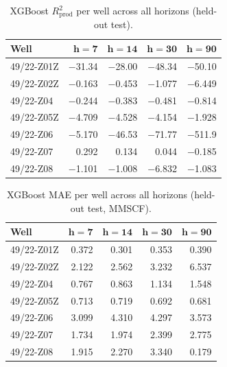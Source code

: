 \documentclass[10pt]{article}
\begin{document}
\begin{table}[ht]
\centering
\caption{XGBoost $R^2_\text{prod}$ per well across all horizons (held-out test).}
\label{tab:xgboost_r2prod_perwell}
\small
\begin{tabular}{@{}l rrrr @{}}
\toprule
\textbf{Well} & $\boldsymbol{h{=}7}$ & $\boldsymbol{h{=}14}$ & $\boldsymbol{h{=}30}$ & $\boldsymbol{h{=}90}$ \\
\midrule
49/22-Z01Z & $-$31.34  & $-$28.00  & $-$48.34  & $-$50.10  \\
49/22-Z02Z &   $-$0.163 &   $-$0.453 &   $-$1.077 &   $-$6.449 \\
49/22-Z04  &   $-$0.244 &   $-$0.383 &   $-$0.481 &   $-$0.814 \\
49/22-Z05Z &   $-$4.709 &   $-$4.528 &   $-$4.154 &   $-$1.928 \\
49/22-Z06  &   $-$5.170 &  $-$46.53  &  $-$71.77  & $-$511.9   \\
49/22-Z07  &    0.292 &    0.134 &    0.044 &   $-$0.185 \\
49/22-Z08  &   $-$1.101 &   $-$1.008 &   $-$6.832 &   $-$1.083 \\
\bottomrule
\end{tabular}
\end{table}


\begin{table}[ht]
\centering
\caption{XGBoost MAE per well across all horizons (held-out test, MMSCF).}
\label{tab:xgboost_mae_perwell}
\small
\begin{tabular}{@{}l rrrr @{}}
\toprule
\textbf{Well} & $\boldsymbol{h{=}7}$ & $\boldsymbol{h{=}14}$ & $\boldsymbol{h{=}30}$ & $\boldsymbol{h{=}90}$ \\
\midrule
49/22-Z01Z & 0.372 & 0.301 & 0.353 & 0.390 \\
49/22-Z02Z & 2.122 & 2.562 & 3.232 & 6.537 \\
49/22-Z04  & 0.767 & 0.863 & 1.134 & 1.548 \\
49/22-Z05Z & 0.713 & 0.719 & 0.692 & 0.681 \\
49/22-Z06  & 3.099 & 4.310 & 4.297 & 3.573 \\
49/22-Z07  & 1.734 & 1.974 & 2.399 & 2.775 \\
49/22-Z08  & 1.915 & 2.270 & 3.340 & 0.179 \\
\bottomrule
\end{tabular}
\end{table}
\end{document}
